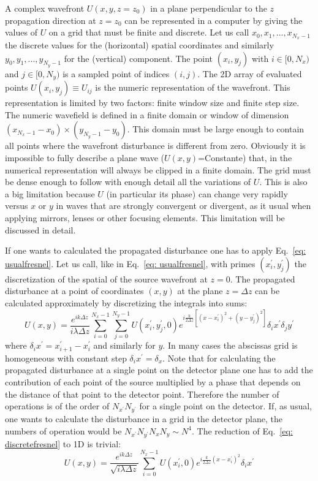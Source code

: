 \documentclass{iucr}              %
\begin{document}
A complex wavefront $U(x,y,z=z_0)$ in a plane perpendicular to the $z$ propagation direction at $z=z_0$ can be represented in a computer by giving the values of $U$ on a grid that must be finite and discrete. Let us call ${x_0,x_1,...,x_{N_x-1}}$ the discrete values for the (horizontal) spatial coordinates and similarly  ${y_0,y_1,...,y_{N_y-1}}$ for the (vertical) component. The point $(x_i,y_j)$ with $i \in [0,N_x)$ and  $j \in [0,N_y)$ is a sampled point of indices $(i,j)$. The 2D array of evaluated points $U(x_i,y_j) \equiv U_{ij}$ is the numeric representation of the wavefront. This representation is limited by two factors: finite window size and finite step size. The numeric wavefield is defined in a finite domain or window of dimension $(x_{N_x-1}-x_0) \times (y_{N_y-1}-y_0)$. This domain must be large enough to contain all points where the wavefront disturbance is different from zero. Obviously it is impossible to fully describe a plane wave ($U(x,y)$=Constante) that, in the numerical representation will always be clipped in a finite domain. The grid must be dense enough to follow with enough detail all the variations of $U$. This is also a big limitation because $U$ (in particular its phase) can change very rapidly versus $x$ or $y$ in waves that are strongly convergent or divergent, as it usual when applying mirrors, lenses or other focusing elements. This limitation will be discussed in detail. 

If one wants to calculated the propagated disturbance one has to apply Eq.~\ref{eq: usualfresnel}. Let us call, like in Eq.~\ref{eq: usualfresnel}, with primes $(x^\prime_i,y^\prime_j)$ the discretization of the spatial of the source wavefront at $z=0$. The propagated disturbance at a point of coordinates $(x,y)$ at the plane $z=\Delta z$ can be calculated approximately by discretizing the integrals into sums: 
\begin{equation}\label{eq: discretefresnel}
 U(x,y) = \frac {e^{ik\Delta z }}{ i \lambda \Delta z} \sum_{i=0}^{N_x-1}  \sum_{j=0}^{N_y-1} U(x^\prime_i, y^\prime_j, 0) e^{i \frac{k}{2 \Delta z} [(x - x_i^\prime)^2 + (y - y_j^\prime)^2]} \delta_i x^\prime \delta_j y^\prime
\end{equation}
where $\delta_i x^\prime = x^\prime_{i+1} - x^\prime_i$ and similarly for $y$. In many cases the abscissas grid is homogeneous with constant step $\delta_i x^\prime = \delta_x$. Note that for calculating the propagated disturbance at a single point on the detector plane one has to add the contribution of each point of the source multiplied by a phase that depends on the distance of that point to the detector point. Therefore the number of operations is of the order of $N_{x^\prime}  N_{y^\prime}$ for a single point on the detector. If, as usual, one wants to calculate the disturbance in a grid in the detector plane, the numbers of operation would be $N_{x^\prime}  N_{y^\prime} N_{x}  N_{y} \sim N^4$. 
The reduction of Eq.~\ref{eq: discretefresnel} to 1D is trivial:
\begin{equation}\label{eq: discretefresnel1D}
 U(x,y) = \frac {e^{ik\Delta z }}{ \sqrt{i \lambda \Delta z}} \sum_{i=0}^{N_x-1}  U(x^\prime_i, 0) e^{i \frac{k}{2 \Delta z} (x - x_i^\prime)^2 } \delta_i x^\prime
\end{equation}
\end{document}
